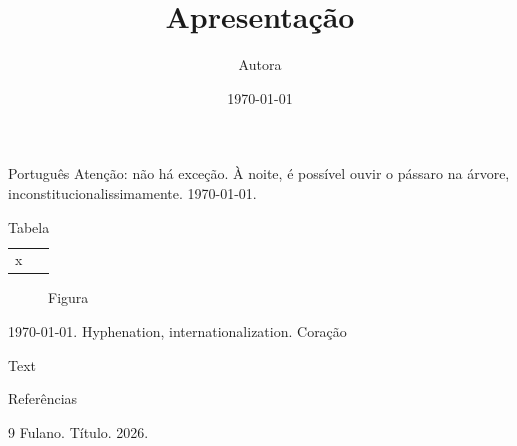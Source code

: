 \documentclass{nicrainha}
\title{Apresentação}\author{Autora}\date{\today}
\begin{document}
\maketitle
\begin{slide}{Português}
  Atenção: não há exceção. À noite, é possível ouvir o pássaro na árvore,
  inconstitucionalissimamente. \today.
  \begin{table}\begin{tabular}{l}x\end{tabular}\caption{Tabela}\end{table}
  \begin{figure}\caption{Figura}\end{figure}
  \today. Hyphenation, internationalization.
  \foreignlanguage{brazil}{Coração} \begin{otherlanguage}{english}Text\end{otherlanguage}
\end{slide}
\begin{slide}{Referências}
  \begin{thebibliography}{9} Fulano. Título. 2026.\end{thebibliography}
\end{slide}
\end{document}

